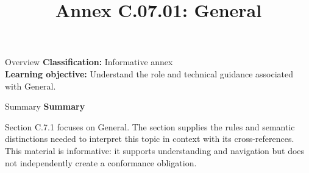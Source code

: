 \documentclass[10pt,letterpaper]{article}
\title{Annex C.07.01: General}
\author{}
\date{}
\begin{document}
\maketitle
\begin{CornellOverviewBox}{Overview}
\textbf{Classification:} Informative annex\\[2pt]
\textbf{Learning objective:} Understand the role and technical guidance associated with General.
\end{CornellOverviewBox}\begin{CornellSummaryBox}{Summary}
{\sffamily\bfseries\color{Accent} Summary}\par\vspace{3pt}Section C.7.1 focuses on General. The section supplies the rules and semantic distinctions needed to interpret this topic in context with its cross-references. This material is informative: it supports understanding and navigation but does not independently create a conformance obligation.
\end{CornellSummaryBox}
\end{document}

